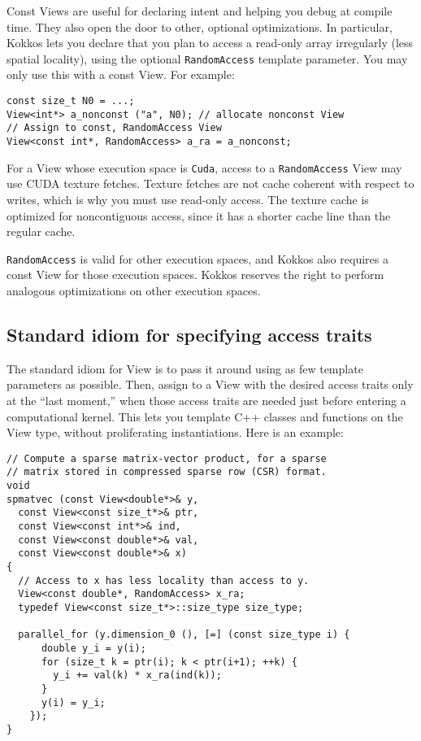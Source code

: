 Const Views are useful for declaring intent and helping you debug at
compile time.  They also open the door to other, optional
optimizations.  In particular, Kokkos lets you declare that you plan
to access a read-only array irregularly (less spatial locality), using
the optional \lstinline!RandomAccess! template parameter.  You may only use
this with a const View.  For example:
\begin{lstlisting}
const size_t N0 = ...;
View<int*> a_nonconst ("a", N0); // allocate nonconst View
// Assign to const, RandomAccess View
View<const int*, RandomAccess> a_ra = a_nonconst;
\end{lstlisting}
For a View whose execution space is \lstinline!Cuda!, access to a
\lstinline!RandomAccess! View may use CUDA texture fetches.  Texture
fetches are not cache coherent with respect to writes, which is why
you must use read-only access.  The texture cache is optimized for
noncontiguous access, since it has a shorter cache line than the
regular cache.

\lstinline!RandomAccess! is valid for other execution spaces, and Kokkos
also requires a const View for those execution spaces.  Kokkos
reserves the right to perform analogous optimizations on other
execution spaces.

\subsection{Standard idiom for specifying access traits}

The standard idiom for View is to pass it around using as few template
parameters as possible.  Then, assign to a View with the desired
access traits only at the ``last moment,'' when those access traits
are needed just before entering a computational kernel.  This lets you
template C++ classes and functions on the View type, without
proliferating instantiations.  Here is an example:

\begin{lstlisting}
// Compute a sparse matrix-vector product, for a sparse
// matrix stored in compressed sparse row (CSR) format.
void
spmatvec (const View<double*>& y, 
  const View<const size_t*>& ptr,
  const View<const int*>& ind,
  const View<const double*>& val,
  const View<const double*>& x)
{
  // Access to x has less locality than access to y.
  View<const double*, RandomAccess> x_ra;
  typedef View<const size_t*>::size_type size_type;

  parallel_for (y.dimension_0 (), [=] (const size_type i) {
      double y_i = y(i);
      for (size_t k = ptr(i); k < ptr(i+1); ++k) {
        y_i += val(k) * x_ra(ind(k));
      }
      y(i) = y_i;
    });
}
\end{lstlisting}


